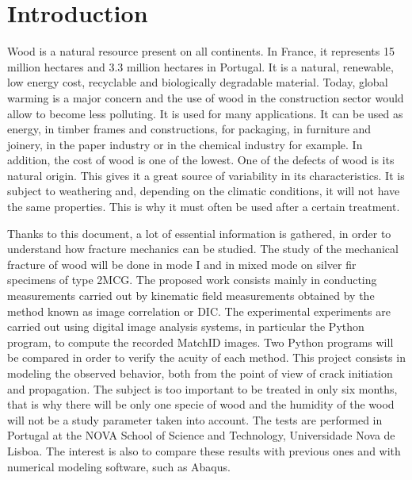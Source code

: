 
\chapter{Introduction} %

\label{Introduction} %


Wood is a natural resource present on all continents. In France, it represents 15 million hectares and 3.3 million hectares in Portugal. It is a natural, renewable, low energy cost, recyclable and biologically degradable material. Today, global warming is a major concern and the use of wood in the construction sector would allow to become less polluting. It is used for many applications. It can be used as energy, in timber frames and constructions, for packaging, in furniture and joinery, in the paper industry or in the chemical industry for example. In addition, the cost of wood is one of the lowest. One of the defects of wood is its natural origin. This gives it a great source of variability in its characteristics. It is subject to weathering and, depending on the climatic conditions, it will not have the same properties. This is why it must often be used after a certain treatment.

Thanks to this document, a lot of essential information is gathered, in order to understand how fracture mechanics can be studied. The study of the mechanical fracture of wood will be done in mode I and in mixed mode on silver fir specimens of type 2MCG. The proposed work consists mainly in conducting measurements carried out by kinematic field measurements obtained by the method known as image correlation or DIC. The experimental experiments are carried out using digital image analysis systems, in particular the Python program, to compute the recorded MatchID images. Two Python programs will be compared in order to verify the acuity of each method. This project consists in modeling the observed behavior, both from the point of view of crack initiation and propagation. The subject is too important to be treated in only six months, that is why there will be only one specie of wood and the humidity of the wood will not be a study parameter taken into account. The tests are performed in Portugal at the NOVA School of Science and Technology, Universidade Nova de Lisboa. The interest is also to compare these results with previous ones and with numerical modeling software, such as Abaqus.

